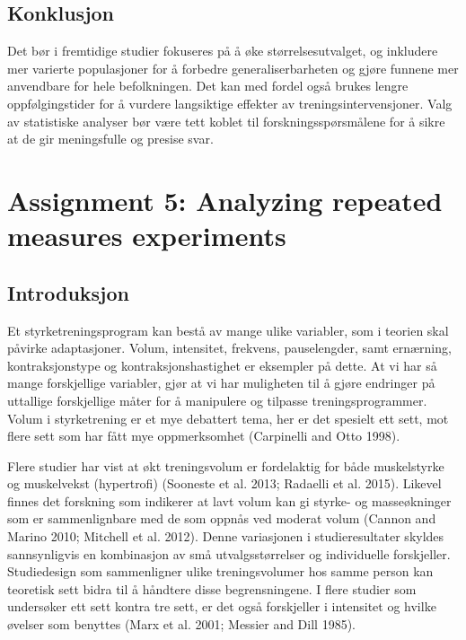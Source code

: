 \documentclass[
  letterpaper,
  DIV=11,
  numbers=noendperiod]{scrreprt}
\begin{document}
\section{Konklusjon}\label{konklusjon}

Det bør i fremtidige studier fokuseres på å øke størrelsesutvalget, og
inkludere mer varierte populasjoner for å forbedre generaliserbarheten
og gjøre funnene mer anvendbare for hele befolkningen. Det kan med
fordel også brukes lengre oppfølgingstider for å vurdere langsiktige
effekter av treningsintervensjoner. Valg av statistiske analyser bør
være tett koblet til forskningsspørsmålene for å sikre at de gir
meningsfulle og presise svar.


\chapter{Assignment 5: Analyzing repeated measures
experiments}\label{assignment-5-analyzing-repeated-measures-experiments}

\section{Introduksjon}\label{introduksjon-4}

Et styrketreningsprogram kan bestå av mange ulike variabler, som i
teorien skal påvirke adaptasjoner. Volum, intensitet, frekvens,
pauselengder, samt ernærning, kontraksjonstype og kontraksjonshastighet
er eksempler på dette. At vi har så mange forskjellige variabler, gjør
at vi har muligheten til å gjøre endringer på uttallige forskjellige
måter for å manipulere og tilpasse treningsprogrammer. Volum i
styrketrening er et mye debattert tema, her er det spesielt ett sett,
mot flere sett som har fått mye oppmerksomhet (Carpinelli and Otto
1998).

Flere studier har vist at økt treningsvolum er fordelaktig for både
muskelstyrke og muskelvekst (hypertrofi) (Sooneste et al. 2013; Radaelli
et al. 2015). Likevel finnes det forskning som indikerer at lavt volum
kan gi styrke- og masseøkninger som er sammenlignbare med de som oppnås
ved moderat volum (Cannon and Marino 2010; Mitchell et al. 2012). Denne
variasjonen i studieresultater skyldes sannsynligvis en kombinasjon av
små utvalgsstørrelser og individuelle forskjeller. Studiedesign som
sammenligner ulike treningsvolumer hos samme person kan teoretisk sett
bidra til å håndtere disse begrensningene. I flere studier som
undersøker ett sett kontra tre sett, er det også forskjeller i
intensitet og hvilke øvelser som benyttes (Marx et al. 2001; Messier and
Dill 1985).
\end{document}
